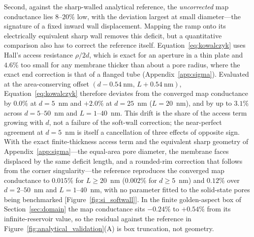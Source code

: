 
Second, against the sharp-walled analytical reference, the \emph{uncorrected} map conductance lies $8$--$20\%$ low, with the deviation largest at small diameter---the signature of a fixed inward wall displacement. Mapping the ramp onto its electrically equivalent sharp wall removes this deficit, but a quantitative comparison also has to correct the reference itself. Equation~\eqref{eq:kowalczyk} uses Hall's access resistance $\rho/2d$, which is exact for an aperture in a thin plate and $4.6\%$ too small for any membrane thicker than about a pore radius, where the exact end correction is that of a flanged tube (Appendix~\ref{app:sigma}). Evaluated at the area-conserving offset $(d-0.54~\text{nm},\,L+0.54~\text{nm})$, Equation~\eqref{eq:kowalczyk} therefore deviates from the converged map conductance by $0.0\%$ at $d = 5$~nm and $+2.0\%$ at $d = 25$~nm ($L = 20$~nm), and by up to $3.1\%$ across $d = 5$--$50$~nm and $L = 1$--$40$~nm. This drift is the share of the access term growing with $d$, not a failure of the soft-wall correction; the near-perfect agreement at $d = 5$~nm is itself a cancellation of three effects of opposite sign. With the exact finite-thickness access term and the equivalent sharp geometry of Appendix~\ref{app:sigma}---the equal-area pore diameter, the membrane faces displaced by the same deficit length, and a rounded-rim correction that follows from the corner singularity---the reference reproduces the converged map conductance to $0.015\%$ for $L \ge 20$~nm ($0.002\%$ for $d \ge 5$~nm) and $0.12\%$ over $d = 2$--$50$~nm and $L = 1$--$40$~nm, with no parameter fitted to the solid-state pores being benchmarked [Figure~\ref{fig:si_softwall}]. In the finite golden-aspect box of Section~\ref{sec:domain} the map conductance sits $-0.24\%$ to $+0.54\%$ from its infinite-reservoir value, so the residual against the reference in Figure~\ref{fig:analytical_validation}(A) is box truncation, not geometry. 

